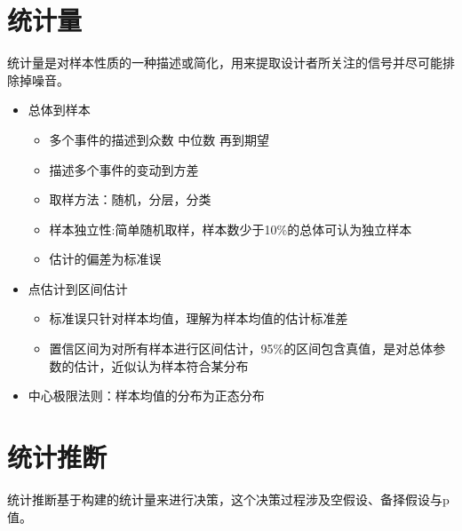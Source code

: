 \documentclass[]{book}
\providecommand{\tightlist}{%
  \setlength{\itemsep}{0pt}\setlength{\parskip}{0pt}}
\begin{document}
\section{统计量}

统计量是对样本性质的一种描述或简化，用来提取设计者所关注的信号并尽可能排除掉噪音。

\begin{itemize}
\item
  总体到样本

  \begin{itemize}
  \tightlist
  \item
    多个事件的描述到众数 中位数 再到期望
  \item
    描述多个事件的变动到方差
  \item
    取样方法：随机，分层，分类
  \item
    样本独立性:简单随机取样，样本数少于10\%的总体可认为独立样本
  \item
    估计的偏差为标准误
  \end{itemize}
\item
  点估计到区间估计

  \begin{itemize}
  \tightlist
  \item
    标准误只针对样本均值，理解为样本均值的估计标准差
  \item
    置信区间为对所有样本进行区间估计，95\%的区间包含真值，是对总体参数的估计，近似认为样本符合某分布
  \end{itemize}
\item
  中心极限法则：样本均值的分布为正态分布
\end{itemize}

\hypertarget{si}{%
\section{统计推断}\label{si}}

统计推断基于构建的统计量来进行决策，这个决策过程涉及空假设、备择假设与p值。
\end{document}
